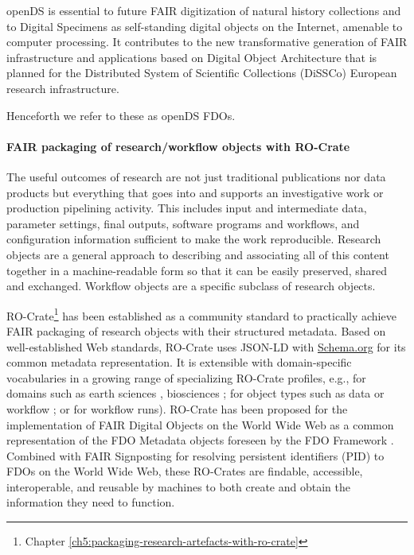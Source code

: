 openDS is essential to future FAIR
digitization of natural history collections and to Digital Specimens as
self-standing digital objects on the Internet, amenable to computer
processing. It contributes to the new transformative generation of FAIR
infrastructure and applications based on Digital Object Architecture
that is planned for the Distributed System of Scientific Collections
(DiSSCo) \cite{ch8-6,ch8-5,ch8-30} European research infrastructure.

Henceforth we refer to these as openDS FDOs.

\paragraph{FAIR packaging of research/workflow objects with
RO-Crate}\label{fair-packaging-of-researchworkflow-objects-with-ro-crate}

The useful outcomes of research are not just traditional publications
nor data products but everything that goes into and supports an
investigative work or production pipelining activity. This includes
input and intermediate data, parameter settings, final outputs, software
programs and workflows, and configuration information sufficient to make
the work reproducible. Research objects \cite{Bechhofer 2013} are a general approach
to describing and associating all of this content together in a
machine-readable form so that it can be easily preserved, shared and
exchanged. Workflow objects are a specific subclass of research objects.

RO-Crate\footnote{Chapter \vref{ch5:packaging-research-artefacts-with-ro-crate}} \cite{OCarragain 2019,Soiland-Reyes 2022} has been established as a community standard to
practically achieve FAIR packaging of research objects with their
structured metadata. Based on well-established Web standards, RO-Crate
uses JSON-LD \cite{ch8-50} with \href{https://schema.org/}{Schema.org}
\cite{ch8-51} for its common metadata representation. It is extensible with
domain-specific vocabularies in a growing range of specializing RO-Crate
profiles, e.g., for domains such as earth sciences \cite{ch8-52}, biosciences
\cite{Goble 2021}; for object types such as data or workflow \cite{Bacall 2021}; or for
workflow runs). RO-Crate has been proposed for the implementation of
FAIR Digital Objects on the World Wide Web as a common representation of
the FDO Metadata objects foreseen by the FDO Framework \cite{Goble 2021,bonino2019}.
Combined with FAIR Signposting \cite{Van de Sompel 2022} for resolving persistent
identifiers (PID) to FDOs on the World Wide Web, these RO-Crates are
findable, accessible, interoperable, and reusable by machines to both
create and obtain the information they need to function.

